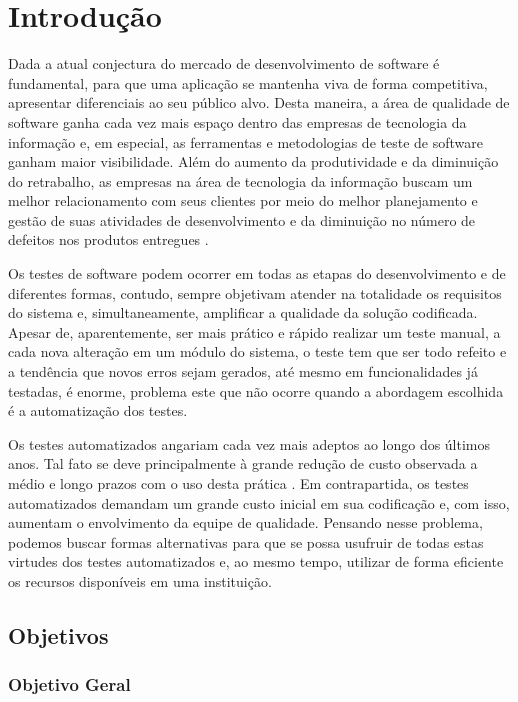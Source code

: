 \documentclass[tg]{mdtufsm}
\begin{document}
\chapter{Introdução}

Dada a atual conjectura do mercado de desenvolvimento de software é fundamental, para
que uma aplicação se mantenha viva de forma competitiva, apresentar diferenciais ao seu público alvo. Desta maneira, a área de qualidade de software ganha cada vez mais espaço dentro das empresas de tecnologia da informação e, em especial, as ferramentas e
metodologias de teste de software ganham maior visibilidade. Além do aumento da produtividade e da diminuição do retrabalho, as empresas na área de tecnologia da informação buscam um melhor relacionamento com seus clientes por meio do melhor planejamento e gestão de suas atividades de desenvolvimento e da diminuição no número de defeitos nos produtos entregues \cite{jomori2004qualidade}.

Os testes de software podem ocorrer em todas as etapas do desenvolvimento e de diferentes formas, contudo,
sempre objetivam atender na totalidade os requisitos do sistema e, simultaneamente, amplificar a qualidade da solução
codificada. Apesar de, aparentemente, ser mais prático e rápido realizar um teste manual, a cada nova alteração em um módulo do sistema,
o teste tem que ser todo refeito e a tendência que novos erros sejam gerados, até mesmo em funcionalidades já testadas, é enorme,
problema este que não ocorre quando a abordagem escolhida é a automatização dos testes. 

Os testes automatizados angariam cada vez mais adeptos ao longo dos últimos anos. Tal fato se deve principalmente à grande redução de custo observada a médio e longo prazos com o uso desta prática \cite{de2007utilizaccao}. Em contrapartida, os testes automatizados demandam um grande custo inicial em sua codificação e, com isso, aumentam o
envolvimento da equipe de qualidade. Pensando nesse problema, podemos buscar formas alternativas para que se possa usufruir de todas estas virtudes dos testes automatizados e, ao mesmo tempo, utilizar de forma eficiente os recursos disponíveis em uma instituição.

\section{Objetivos}

\subsection{Objetivo Geral}
\end{document}
